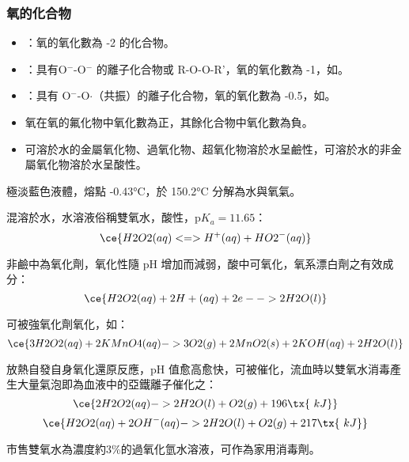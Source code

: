 \documentclass[a4paper,12pt]{report}
\begin{document}
\subsubsection{氧的化合物}
\begin{itemize}
\item {}：氧的氧化數為 -2 的化合物。
\item {}：具有O$^-$-O$^-$ 的離子化合物或 R-O-O-R'，氧的氧化數為 -1，如。
\item {}：具有 O$^-$-O$\cdot$（共振）的離子化合物，氧的氧化數為 -0.5，如。
\item 氧在氧的氟化物中氧化數為正，其餘化合物中氧化數為負。
\item 可溶於水的金屬氧化物、過氧化物、超氧化物溶於水呈鹼性，可溶於水的非金屬氧化物溶於水呈酸性。
\end{itemize}
\bit
\item 極淡藍色液體，熔點 -0.43°C，於 150.2°C 分解為水與氧氣。
\item 混溶於水，水溶液俗稱雙氧水，酸性，p$K_a=11.65$：
\[\ce{H2O2(aq) <=> H^+(aq) + HO2^-(aq)}\]
\item 非鹼中為氧化劑，氧化性隨 pH 增加而減弱，酸中可氧化，氧系漂白劑之有效成分：
\[\ce{H2O2(aq) + 2H+(aq) + 2e- -> 2H2O(l)}\]
\item 可被強氧化劑氧化，如：
\[\ce{3H2O2(aq) + 2KMnO4(aq) -> 3O2(g) + 2MnO2(s) + 2KOH(aq) + 2H2O(l)}\]
\item 放熱自發自身氧化還原反應，pH 值愈高愈快，可被催化，流血時以雙氧水消毒產生大量氣泡即為血液中的亞鐵離子催化之：
\[\ce{2H2O2(aq) -> 2H2O(l) + O2(g) + 196\tx{\ kJ}}\]
\[\ce{H2O2(aq) + 2OH^-(aq) -> 2H2O(l) + O2(g) + 217\tx{\ kJ}}\]
\item 市售雙氧水為濃度約3\%的過氧化氫水溶液，可作為家用消毒劑。
\eit
{}
\end{document}
